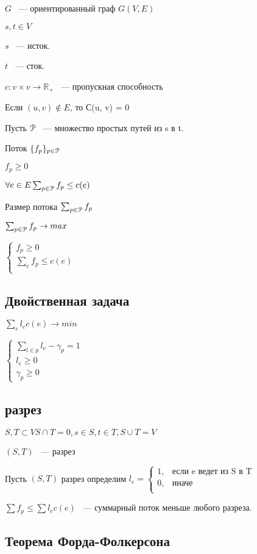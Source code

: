 \documentclass[12pt]{article}
\begin{document}
\begin{description}
$G$ ~--- ориентированный граф $G(V, E)$

$s, t \in V$

$s$ ~--- исток.

$t$ ~--- сток. 

$c: v \times v \to \mathbb R_{+}$ ~--- пропускная способность

Если $(u, v) \notin E$, то С(u, v) = 0

Пусть $\EuScript P$ ~--- множество простых путей из s в t.

Поток $\{f_p\}_{p \in \EuScript P}$

$f_p \ge 0$

$\forall e \in E \sum_{p \in \EuScript P}f_p \le c(e)$

Размер потока $\sum_{p \in \EuScript P}f_p$

$\sum_{p \in \EuScript P} f_p \to max$

$\begin{cases} f_p \ge 0\\ \sum_e f_p \le c(e)\\ \end{cases}$

\subsection{Двойственная задача}

$\sum_e l_e c(e) \to min$

$\begin{cases} \sum_{l \in p}l_e - \gamma_p = 1\\ l_e \ge 0 \\ \gamma_p \ge 0\end{cases}$

\subsection{разрез}

$S, T \subset V S\cap T = 0, s \in S, t \in T, S \cup T = V$

$(S, T)$ ~--- разрез

Пусть $(S, T)$ разрез определим $l_e = \begin{cases} 1, &\text{если e ведет из S в T}\\ 0, &\text{иначе}\\ \end{cases}$

$\sum f_p \le \sum l_e c(e)$ ~--- суммарный поток меньше любого разреза.

\subsection{Теорема Форда-Фолкерсона}


\end{description}
\end{document}
